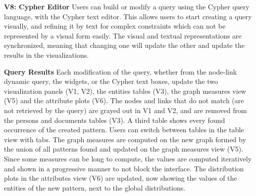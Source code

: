 \noindent\textbf{V8: Cypher Editor}
Users can build or modify a query using the Cypher query language, with the Cypher text editor. This allows users to start creating a query visually, and refining it by text for complex constraints which can not be represented by a visual form easily. The visual and textual representations are synchronized, meaning that changing one will update the other and update the results in the visualizations.


\textbf{Query Results}
Each modification of the query, whether from the node-link dynamic query, the widgets, or the Cypher text boxes, update the two visualization panels (V1, V2), the entities tables (V3), the graph measures view (V5) and the attribute plots (V6).
The nodes and links that do not match (are not retrieved by the query) are grayed out in V1 and V2, and are removed from the persons and documents tables (V3). A third table shows every found occurrence of the created pattern. Users can switch between tables in the table view with tabs.
The graph measures are computed on the new graph formed by the union of all patterns found and updated on the graph measures view (V5). Since some measures can be long to compute, the values are computed iteratively and shown in a progressive manner \cite{fekete2019progressive} to not block the interface.
The distribution plots in the attributes view (V6) are updated, now showing the values of the entities of the new pattern, next to the global distributions.






